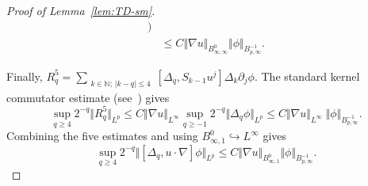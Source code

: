 \documentclass[reqno,11pt,a4paper]{amsart}
\begin{document}
\begin{proof}[Proof of Lemma~\ref{lem:TD-sm}]
\begin{align*}
  \bigg)
  \\
  &\leq C\Vert \nabla u\Vert _{B^0_{\infty,\infty}}
    \Vert \phi\Vert _{B^{-1}_{p,\infty}}.
\end{align*}

Finally,
$R_q^5 =  \sum_{\substack{k\in\mathbb N;\,|k-q|\leq4}}
  [\Delta_q,S_{k-1}u^j]\Delta_k\partial_j\phi$.
The standard kernel commutator estimate
(see~\cite[Lemma~2.97]{BCD11}) gives
\begin{equation}\label{eq:R4-u-phi}
  \sup_{q\geq4}2^{-q}\Vert R_q^5\Vert _{L^p}
  \leq C \Vert \nabla u\Vert _{L^\infty}\sup_{q\ge -1}2^{-q}\Vert \Delta_q \phi\Vert _{L^p} \leq C \Vert \nabla u\Vert _{L^\infty}\;\Vert \phi\Vert _{B^{-1}_{p,\infty}}.
\end{equation}
Combining the five estimates and using
$B^0_{\infty,1}\hookrightarrow L^\infty$ gives
\begin{equation}\label{es:qge4}
  \sup_{q\geq4}
  2^{-q}\Vert [\Delta_q,u\cdot\nabla]\phi\Vert _{L^p}
  \leq
  C\Vert \nabla u\Vert _{B^0_{\infty,1}}
  \Vert \phi\Vert _{B^{-1}_{p,\infty}}.
\end{equation}


\end{proof}
\end{document}
